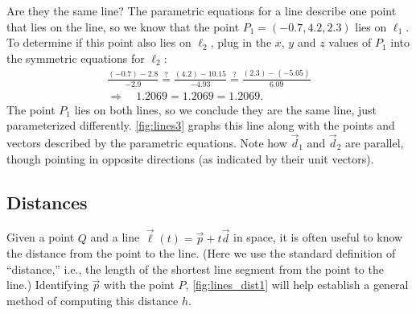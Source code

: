 \begin{example}

Are they the same line? The parametric equations for a line describe one point that lies on the line, so we know that the point $P_1 = (-0.7,4.2,2.3)$ lies on $\ell_1$. To determine if this point also lies on $\ell_2$, plug in the $x$, $y$ and $z$ values of $P_1$ into the symmetric equations for $\ell_2$:
\begin{multline*}
\frac{(-0.7)-2.8}{-2.9} \stackrel{?}{=} \frac{(4.2)-10.15}{-4.93} \stackrel{?}{=} \frac{(2.3)-(-5.05)}{6.09} \\
\Rightarrow \quad 1.2069=1.2069=1.2069.
\end{multline*}
The point $P_1$ lies on both lines, so we conclude they are the same line, just parameterized differently. \autoref{fig:lines3} graphs this line along with the points and vectors described by the parametric equations. Note how $\vec d_1$ and $\vec d_2$ are parallel, though pointing in opposite directions (as indicated by their unit vectors).
\end{example}

\subsection{Distances}


Given a point $Q$ and a line $\vec\ell(t) = \vec p+t\vec d$ in space, it is often useful to know the distance from the point to the line. (Here we use the standard definition of ``distance,'' i.e., the length of the shortest line segment from the point to the line.) Identifying $\vec p$ with the point $P$, \autoref{fig:lines_dist1} will help establish a general method of computing this distance $h$.

